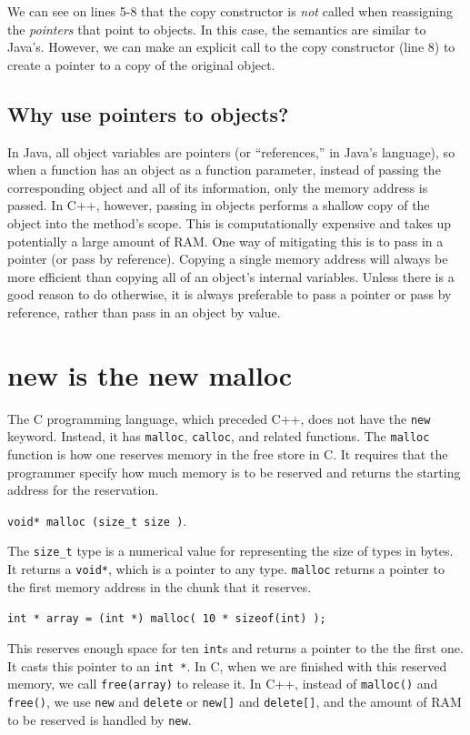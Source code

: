 \documentclass[12pt]{article}
\begin{document}
We can see on lines 5-8 that the copy constructor is \textit{not}
called when reassigning the \textit{pointers} that point to objects.
In this case, the semantics are similar to Java's.  However, we can
make an explicit call to the copy constructor (line 8) to create a
pointer to a copy of the original object.

\subsection{Why use pointers to objects?}

In Java, all object variables are pointers (or ``references,'' in
Java's language), so when a function has an object as a function
parameter, instead of passing the corresponding object and all of its
information, only the memory address is passed.  In C++, however,
passing in objects performs a shallow copy of the object into the
method's scope.  This is computationally expensive and takes up
potentially a large amount of RAM.  One way of mitigating this is to
pass in a pointer (or pass by reference).  Copying a single memory
address will always be more efficient than copying all of an object's
internal variables.  Unless there is a good reason to do otherwise, it
is always preferable to pass a pointer or pass by reference, rather
than pass in an object by value.
\section{new is the new malloc}
The C programming language, which preceded C++, does not have the
\texttt{new} keyword.  Instead, it has \texttt{malloc},
\texttt{calloc}, and related functions.  The \texttt{malloc} function
is how one reserves memory in the free store in C.  It requires that
the programmer specify how much memory is to be reserved and returns
the starting address for the reservation.

\texttt{void* malloc (size\_t size )}.  

The \texttt{size\_t} type is a numerical value for representing the
size of types in bytes.  It returns a \texttt{void*}, which is a
pointer to any type. \texttt{malloc} returns a pointer to the first
memory address in the chunk that it reserves.

\texttt{int * array = (int *) malloc( 10 * sizeof(int) );}

This reserves enough space for ten \texttt{int}s and returns a pointer
to the the first one.  It casts this pointer to an \texttt{int *}.  In
C, when we are finished with this reserved memory, we call
\texttt{free(array)} to release it.  In C++, instead of
\texttt{malloc()} and \texttt{free()}, we use \texttt{new} and
\texttt{delete} or \texttt{new[]} and \texttt{delete[]}, and the
amount of RAM to be reserved is handled by \texttt{new}.
\end{document}
